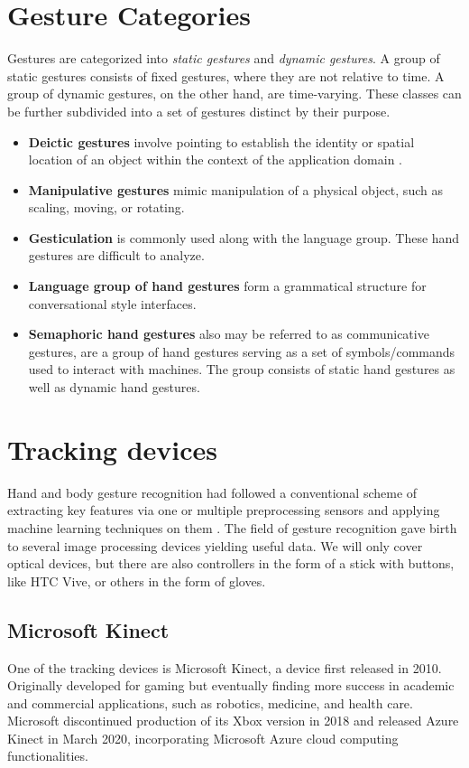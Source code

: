
\section{Gesture Categories}
Gestures are categorized into \textit{static gestures} and \textit{dynamic gestures}. A group of static gestures consists of fixed gestures, where they are not relative to time. A group of dynamic gestures, on the other hand, are time-varying. These classes can be further subdivided into a set of gestures distinct by their purpose.


\begin{itemize}
    \item \textbf{Deictic gestures} involve pointing to establish the identity or spatial location of an object within the context of the application domain \cite{taxonomi}.
    \item \textbf{Manipulative gestures} mimic manipulation of a physical object, such as scaling, moving, or rotating.
    \item \textbf{Gesticulation} is commonly used along with the language group. These hand gestures are difficult to analyze.
    \item \textbf{Language group of hand gestures} form a grammatical structure for conversational style interfaces.
    \item \textbf{Semaphoric hand gestures} also may be referred to as communicative gestures, are a group of hand gestures serving as a set of symbols/commands used to interact with machines. The group consists of static hand gestures as well as dynamic hand gestures. 
\end{itemize}


\section{Tracking devices}
Hand and body gesture recognition had followed a conventional scheme of extracting key features via one or multiple preprocessing sensors and applying machine learning techniques on them \cite{avola}. The field of gesture recognition gave birth to several image processing devices yielding useful data.
We will only cover optical devices, but there are also controllers in the form of a stick with buttons, like HTC Vive, or others in the form of gloves.
\subsection{Microsoft Kinect}
One of the tracking devices is Microsoft Kinect, a device first released in 2010. Originally developed for gaming but eventually finding more success in academic and commercial applications, such as robotics, medicine, and health care. Microsoft discontinued production of its Xbox version in 2018 and released Azure Kinect in March 2020, incorporating Microsoft Azure cloud computing functionalities.

